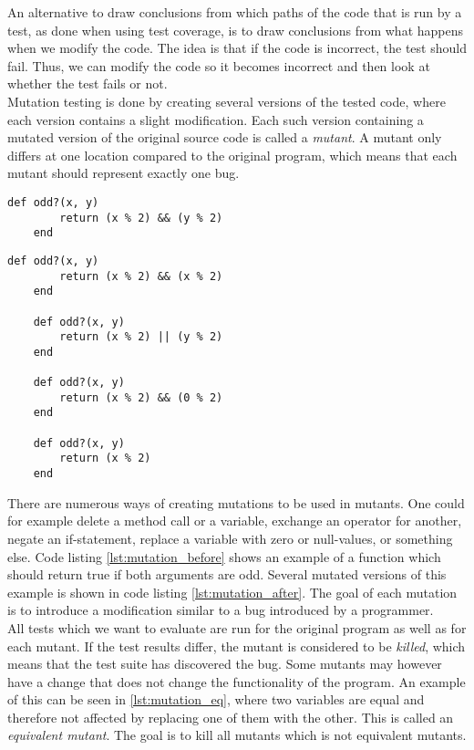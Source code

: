 An alternative to draw conclusions from which paths of the code that is
run by a test, as done when using test coverage, is to draw conclusions
from what happens when we modify the code. The idea is that if the code
is incorrect, the test should fail. Thus, we can modify the code so it
becomes incorrect and then look at whether the test fails or not.\\

Mutation testing is done by creating several versions of the tested
code, where each version contains a slight modification. Each
such version containing a mutated version of the original source code is
called a \emph{mutant}. A mutant only differs at one location compared
to the original program, which means that each mutant should represent
exactly one bug.\cite{article:mutation, wiki:mutation}\\

\begin{lstlisting}[caption=Example of a piece of code before mutation,
                   label=lst:mutation_before, float=t]
    def odd?(x, y)
        return (x % 2) && (y % 2)
    end
\end{lstlisting}


\begin{lstlisting}[caption=Mutated versions of \ref{lst:mutation_before},
                   label=lst:mutation_after, float=t]
    def odd?(x, y)
        return (x % 2) && (x % 2)
    end

    def odd?(x, y)
        return (x % 2) || (y % 2)
    end

    def odd?(x, y)
        return (x % 2) && (0 % 2)
    end

    def odd?(x, y)
        return (x % 2)
    end
\end{lstlisting}

There are numerous ways of creating mutations to be used in mutants. One
could for example delete a method call or a variable, exchange an
operator for another, negate an if-statement, replace a variable with
zero or null-values, or something else. Code listing
\ref{lst:mutation_before} shows an example of a function which should
return true if both arguments are odd. Several mutated versions of this
example is shown in code listing \ref{lst:mutation_after}. The goal of
each mutation is to introduce a modification similar to a bug introduced
by a programmer.\cite{article:mutation}\\

All tests which we want to evaluate are run for the original program as
well as for each mutant. If the test results differ, the mutant is
considered to be \emph{killed}, which means that the test suite has
discovered the bug. Some mutants may however have a change that does not
change the functionality of the program. An example of this can be seen
in \ref{lst:mutation_eq}, where two variables are equal and therefore
not affected by replacing one of them with the other. This is called
an \emph{equivalent mutant}. The goal is to kill all mutants which is
not equivalent mutants.\cite{article:mutation, wiki:mutation}\\

